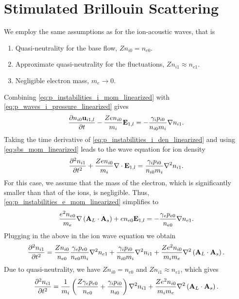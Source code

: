 \documentclass[a4paper,11pt]{report}
\begin{document}
\section{Stimulated Brillouin Scattering}
We employ the same assumptions as for the ion-acoustic waves, that is
\begin{enumerate}
    \item Quasi-neutrality for the base flow, $Zn_{i0} = n_{e0}$.
    \item Approximate quasi-neutrality for the fluctuations, $Z n_{i1} \approx n_{e1}$.
    \item Negligible electron mass, $m_e \to 0$.
\end{enumerate}
Combining \cref{eq:p_instabilities_i_mom_linearized} with \cref{eq:p_waves_i_pressure_linearized} gives
\begin{equation}
    \label{eq:sbs_mom_linearized}
    \frac{\partial n_{i0} \mathbf{u}_{i1,l}}{\partial t} - \frac{Z e n_{i0}}{m_i} \mathbf{E}_{1,l} = - \frac{\gamma_i p_{i0}}{n_{i0} m_i} \nabla n_{i1}.
\end{equation}
Taking the time derivative of \cref{eq:p_instabilities_i_den_linearized} and using \cref{eq:sbs_mom_linearized} leads to the wave equation for ion density
\begin{equation}
    \frac{\partial^2 n_{i1}}{\partial t^2} + \frac{Z e n_{i0}}{m_i} \nabla \cdot \mathbf{E}_{1,l} = \frac{\gamma_i p_{i0}}{n_{i0} m_i} \nabla^2 n_{i1}.
\end{equation}
For this case, we assume that the mass of the electron, which is significantly smaller than that of the ions, is negligible. Thus, \cref{eq:p_instabilities_e_mom_linearized} simplifies to 
\begin{equation}
    \frac{e^2 n_{e0}}{m_e} \nabla \left (\mathbf{A}_L \cdot \mathbf{A}_s \right ) + e n_{e0} \mathbf{E}_{1,l} = -\frac{\gamma_e p_{e0}}{n_{e0}} \nabla n_{e1}.
\end{equation}
Plugging in the above in the ion wave equation we obtain
\begin{equation}
    \frac{\partial^2 n_{i1}}{\partial t^2} = \frac{Z n_{i0}}{n_{e0}} \frac{\gamma_e p_{e0}}{n_{e0} m_i} \nabla^2 n_{e1} + \frac{\gamma_i p_{i0}}{n_{i0} m_i} \nabla^2 n_{i1} + \frac{Z e^2 n_{i0}}{m_i m_e} \nabla^2 \left (\mathbf{A}_L \cdot \mathbf{A}_s \right ).
\end{equation}
Due to quasi-neutrality, we have $Zn_{i0} = n_{e0}$ and $Zn_{i1} \approx n_{e1}$, which gives
\begin{equation}
    \frac{\partial^2 n_{i1}}{\partial t^2} = \frac{1}{m_i} \left ( \frac{Z \gamma_e p_{e0}}{n_{e0}} + \frac{\gamma_i p_{i0}}{n_{i0}} \right ) \nabla^2 n_{i1} + \frac{Z e^2 n_{i0}}{m_i m_e} \nabla^2 \left (\mathbf{A}_L \cdot \mathbf{A}_s \right ).
\end{equation}
\end{document}
